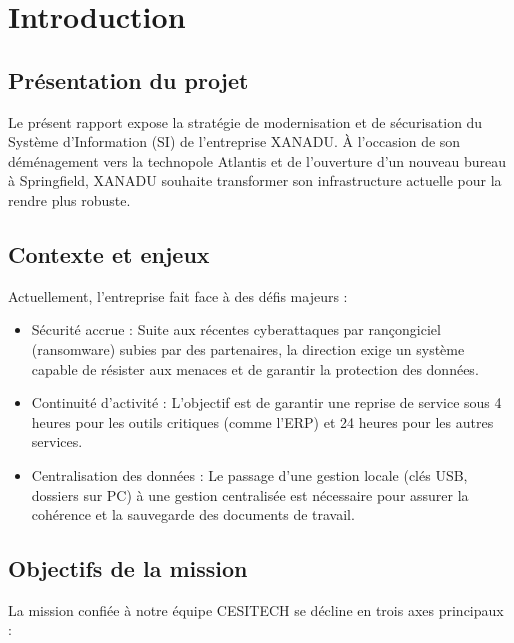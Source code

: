 \newpage
\section*{Introduction}

\subsection*{Présentation du projet}
{}

Le présent rapport expose la stratégie de modernisation et de sécurisation du Système d’Information (SI) de l’entreprise XANADU. À l’occasion de son déménagement vers la technopole Atlantis et de l'ouverture d'un nouveau bureau à Springfield, XANADU souhaite transformer son infrastructure actuelle pour la rendre plus robuste.

\subsection*{Contexte et enjeux}
{}

\noindent Actuellement, l’entreprise fait face à des défis majeurs :

\begin{itemize}
    \item Sécurité accrue : Suite aux récentes cyberattaques par rançongiciel (ransomware) subies par des partenaires, la direction exige un système capable de résister aux menaces et de garantir la protection des données.
    \item Continuité d'activité : L'objectif est de garantir une reprise de service sous 4 heures pour les outils critiques (comme l'ERP) et 24 heures pour les autres services.
    \item Centralisation des données : Le passage d'une gestion locale (clés USB, dossiers sur PC) à une gestion centralisée est nécessaire pour assurer la cohérence et la sauvegarde des documents de travail.
\end{itemize}

\subsection*{Objectifs de la mission}
{}

\noindent La mission confiée à notre équipe CESITECH se décline en trois axes principaux :

